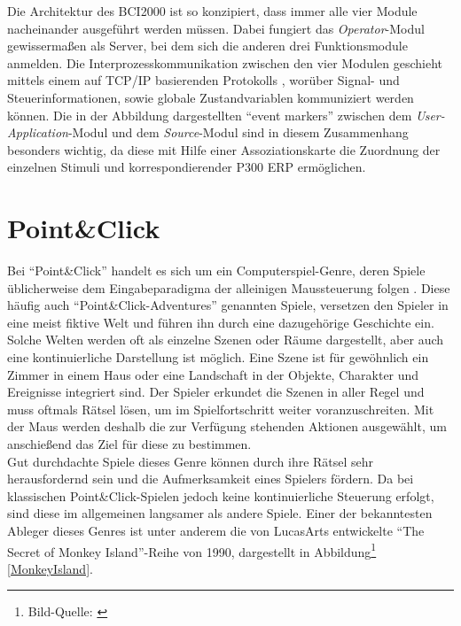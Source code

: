 Die Architektur des \acs{BCI2000} ist so konzipiert, dass immer alle vier Module nacheinander ausgeführt werden müssen. 
Dabei fungiert das \textit{Operator}-Modul gewissermaßen als Server, bei dem sich die anderen drei Funktionsmodule anmelden. 
Die Interprozesskommunikation zwischen den vier Modulen geschieht mittels einem auf TCP/IP basierenden Protokolls \cite[s.38ff]{schalk2010practical},
worüber Signal- und Steuerinformationen, sowie globale Zustandvariablen kommuniziert werden können.
Die in der Abbildung dargestellten "`event markers"' zwischen dem \textit{User-Application}-Modul und dem \textit{\mbox{Source}}-Modul sind in diesem Zusammenhang besonders wichtig, 
da diese mit Hilfe einer Assoziationskarte die Zuordnung der einzelnen Stimuli und korrespondierender \acs{P300 ERP} ermöglichen.\\




\pagebreak
\section{Point\&Click}
Bei "`Point\&Click"' handelt es sich um ein Computerspiel-Genre, deren Spiele üblicherweise dem Eingabeparadigma der alleinigen Maussteuerung folgen \cite[Kapitel 11]{darby2013creating}.
Diese häufig auch "`Point\&Click-Adventures"' genannten Spiele, 
versetzen den Spieler in eine meist fiktive Welt und führen ihn durch eine dazugehörige Geschichte ein.
Solche Welten werden oft als einzelne Szenen oder Räume dargestellt, aber auch eine kontinuierliche Darstellung ist möglich.
Eine Szene ist für gewöhnlich ein Zimmer in einem Haus oder eine Landschaft in der Objekte, Charakter und Ereignisse integriert sind. 
Der Spieler erkundet die Szenen in aller Regel und muss oftmals Rätsel lösen, um im Spielfortschritt weiter voranzuschreiten.
Mit der Maus werden deshalb die zur Verfügung stehenden Aktionen ausgewählt, um anschießend das Ziel für diese zu bestimmen.\\
Gut durchdachte Spiele dieses Genre können durch ihre Rätsel sehr herausfordernd sein und die Aufmerksamkeit eines Spielers fördern.
Da bei klassischen Point\&Click-Spielen jedoch keine kontinuierliche Steuerung erfolgt, sind diese im allgemeinen langsamer als andere Spiele.
Einer der bekanntesten Ableger dieses Genres ist unter anderem die von LucasArts entwickelte "`The Secret of Monkey Island"'-Reihe von 1990, 
dargestellt in Abbildung\footnote[1]{Bild-Quelle: \cite{TSOMI90} } \ref{MonkeyIsland}. \\


